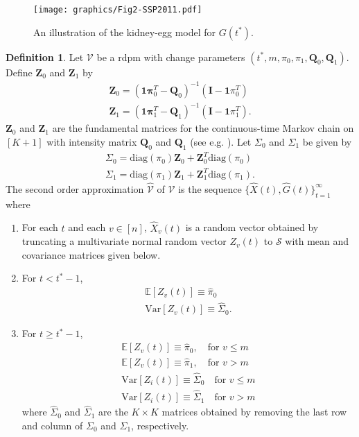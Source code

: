 \documentclass[10pt,journal,compsoc]{IEEEtran}
\theoremstyle{definition}
\newtheorem{definition}{Definition}
\begin{document}
\begin{figure}[!tp]
  \centering
  \texttt{[image: graphics/Fig2-SSP2011.pdf]}
  \caption{An illustration of the kidney-egg model for $G(t^{*})$.}
  \label{fig:kidney-egg}
\end{figure}
 \begin{definition}
  \label{def:2}
  Let $\mathscr{V}$ be a rdpm with change parameters $(t^{*}, m,
  \pi_0, \pi_1, \mathbf{Q}_0, \mathbf{Q}_1)$. Define
  $\mathbf{Z}_0$ and $\mathbf{Z}_1$ by
  \begin{gather}
    \mathbf{Z}_0 = (\mathbf{1}\mathbf{\pi}_0^{T} -
     \mathbf{Q}_0)^{-1}(\mathbf{I} - \mathbf{1}\pi_0^{T}) \\
    \mathbf{Z}_1 = (\mathbf{1}\mathbf{\pi}_1^{T} -
     \mathbf{Q}_1)^{-1}(\mathbf{I} - \mathbf{1}\pi_1^{T}).
  \end{gather}
  $\mathbf{Z}_0$ and $\mathbf{Z}_1$ are the fundamental matrices
  for the continuous-time Markov chain on $[K+1]$ with intensity
  matrix $\mathbf{Q}_0$ and $\mathbf{Q}_1$ (see
  e.g. \cite[p. 55]{asmussen03:_applied_probab_queues}). Let
  $\Sigma_0$ and $\Sigma_1$ be given by
  \begin{gather*}
    \Sigma_0 = \mathrm{diag}(\pi_0) \mathbf{Z}_0 +
    \mathbf{Z}_0^{T}
    \mathrm{diag}(\pi_0) \\
    \Sigma_1 = \mathrm{diag}(\pi_1) \mathbf{Z}_1 +
    \mathbf{Z}_1^{T}
    \mathrm{diag}(\pi_1).
  \end{gather*}
  The second order approximation $\widehat{\mathscr{V}}$ of
  $\mathscr{V}$ is the sequence $\{\widehat{X}(t),
  \widehat{G}(t)\}_{t=1}^{\infty}$ where
  \begin{enumerate}
  \item For each $t$ and each $v \in [n]$, $\widehat{X}_v(t)$ is a
    random vector obtained by truncating a multivariate normal random
    vector $Z_{v}(t)$ to $\mathscr{S}$ with mean and covariance
    matrices given below.
  \item For $t < t^{*} - 1$,
    \begin{gather}
      \mathbb{E}[Z_v(t)] \equiv \hat{\pi}_0 \\
      \mathrm{Var}[Z_v(t)] \equiv \widehat{\Sigma}_0.
    \end{gather}
  \item For $t \geq t^{*} - 1$,  
    \begin{gather*}
      \mathbb{E}[Z_v(t)] \equiv \hat{\pi}_0, \quad \text{for $v \leq
        m$}  \\
      \mathbb{E}[Z_v(t)] \equiv \hat{\pi}_1, \quad \text{for $v > 
        m$}  \\
      \mathrm{Var}[Z_i(t)] \equiv \widehat{\Sigma}_{0} \quad \text{for $v
        \leq m$} \\
      \mathrm{Var}[Z_i(t)] \equiv \widehat{\Sigma}_{1} \quad \text{for $v
        > m$}
    \end{gather*}
    where $\widehat{\Sigma}_0$ and $\widehat{\Sigma}_1$ are the $K
    \times K$ matrices
    obtained by removing the last row and column of $\Sigma_0$ and
    $\Sigma_1$, respectively. 
  \end{enumerate}
\end{definition}
\end{document}
